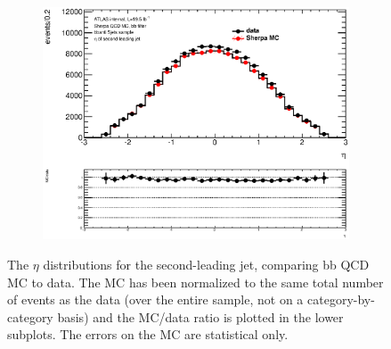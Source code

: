\begin{figure}[phtb!]
\begin{center}
  \begin{subfigure}[$bbanti$ 5+ jet category]{0.3\textwidth}\includegraphics[width=\textwidth]{MonteCarlo/figures/eta1_bbanti_5jets.eps}\end{subfigure}
  \caption{The $\eta$ distributions for the second-leading jet, comparing bb QCD MC to data.  The MC has been normalized
  to the same total number of events as the data (over the entire sample, not on a category-by-category basis)
  and the MC/data ratio is plotted in the lower subplots.  The errors on the MC are statistical only.
  \label{fig:bb_qcd_mc_eta1}}
    \end{center}
\end{figure}






